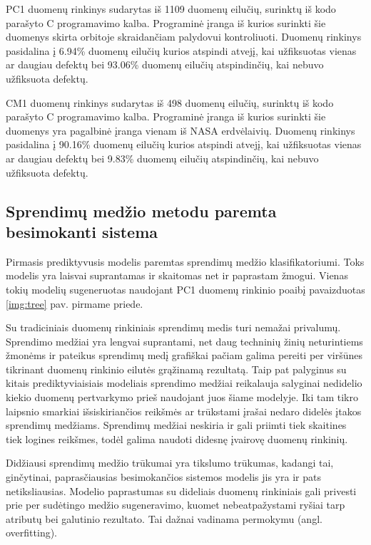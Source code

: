 \documentclass{VUMIFPSbakalaurinis}
\begin{document}
PC1 duomenų rinkinys sudarytas iš 1109 duomenų eilučių, surinktų iš kodo parašyto C programavimo kalba. Programinė įranga iš kurios surinkti šie duomenys skirta orbitoje skraidančiam palydovui kontroliuoti. Duomenų rinkinys pasidalina į 6.94\% duomenų eilučių kurios atspindi atvejį, kai užfiksuotas vienas ar daugiau defektų bei 93.06\% duomenų eilučių atspindinčių, kai nebuvo užfiksuota defektų.

CM1 duomenų rinkinys sudarytas iš 498 duomenų eilučių, surinktų iš kodo parašyto C programavimo kalba. Programinė įranga iš kurios surinkti šie duomenys yra pagalbinė įranga vienam iš NASA erdvėlaivių. Duomenų rinkinys pasidalina į 90.16\% duomenų eilučių kurios atspindi atvejį, kai užfiksuotas vienas ar daugiau defektų bei 9.83\% duomenų eilučių atspindinčių, kai nebuvo užfiksuota defektų.

\subsection{Sprendimų medžio metodu paremta besimokanti sistema}
Pirmasis prediktyvusis modelis paremtas sprendimų medžio klasifikatoriumi. Toks modelis yra laisvai suprantamas ir skaitomas net ir paprastam žmogui. Vienas tokių modelių sugeneruotas naudojant PC1 duomenų rinkinio poaibį pavaizduotas \ref{img:tree} pav. pirmame priede. 

Su tradiciniais duomenų rinkiniais sprendimų medis turi nemažai privalumų. Sprendimo medžiai yra lengvai suprantami, net daug techninių žinių neturintiems žmonėms ir pateikus sprendimų medį grafiškai pačiam galima pereiti per viršūnes tikrinant duomenų rinkinio eilutės grąžinamą rezultatą. Taip pat palyginus su kitais prediktyviaisiais modeliais sprendimo medžiai reikalauja salyginai nedidelio kiekio duomenų pertvarkymo prieš naudojant juos šiame modelyje. Iki tam tikro laipsnio smarkiai išsiskiriančios reikšmės ar trūkstami įrašai nedaro didelės įtakos sprendimų medžiams. Sprendimų medžiai neskiria ir gali priimti tiek skaitines tiek logines reikšmes, todėl galima naudoti didesnę įvairovę duomenų rinkinių.

Didžiausi sprendimų medžio trūkumai yra tikslumo trūkumas, kadangi tai, ginčytinai, paprasčiausias besimokančios sistemos modelis jis yra ir pats netiksliausias. Modelio paprastumas su dideliais duomenų rinkiniais gali privesti prie per sudėtingo medžio sugeneravimo, kuomet nebeatpažystami ryšiai tarp atributų bei galutinio rezultato. Tai dažnai vadinama permokymu (angl. overfitting).
\end{document}
